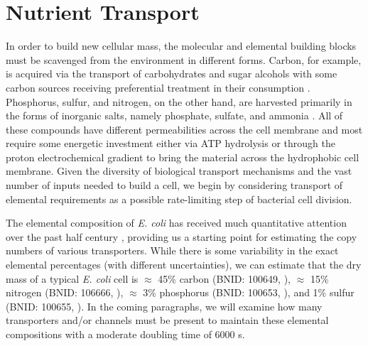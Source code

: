 \section{Nutrient Transport}
In order to build new cellular mass, the molecular and elemental building
blocks must be scavenged from the environment in different forms. Carbon, for
example, is acquired via the transport of carbohydrates and sugar alcohols
with some carbon sources receiving preferential treatment in their
consumption \citep{monod1947}. Phosphorus, sulfur, and nitrogen, on the other
hand, are harvested primarily in the forms of inorganic salts, namely
phosphate, sulfate, and ammonia \citep{jun2018, assentoft2016, stasi2019,
antonenko1997, rosenberg1977, willsky1973}. All of these compounds have
different permeabilities across the cell membrane and most require some
energetic investment either via ATP hydrolysis or through the proton
electrochemical gradient to bring the material across the hydrophobic cell
membrane. Given the diversity of biological transport mechanisms and the vast
number of inputs needed to build a cell, we begin by considering transport of
elemental requirements as a possible rate-limiting step of bacterial cell
division.

The elemental composition of \textit{E. coli} has received much quantitative
attention over the past half century \citep{neidhardt1991, taymaz-nikerel2010,
heldal1985, bauer1976}, providing us a starting point for estimating the
copy numbers of various transporters. While there is some variability in the
exact elemental percentages (with different uncertainties), we can estimate that the
dry mass of a typical \textit{E. coli} cell is $\approx$ 45\% carbon (BNID:
100649, \cite{milo2010}), $\approx$ 15\% nitrogen (BNID: 106666,
\cite{milo2010}), $\approx$ 3\% phosphorus (BNID: 100653, \cite{milo2010}), and
1\% sulfur (BNID: 100655, \cite{milo2010}). In the coming paragraphs, we will examine how many transporters and/or channels
must be present to maintain these elemental compositions with a moderate
doubling time of 6000 s.

